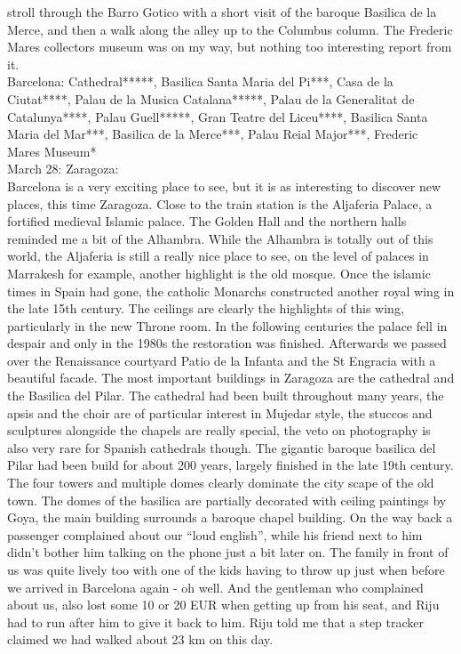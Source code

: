 stroll through the Barro Gotico with a short visit of the baroque Basilica de la Merce, and then a walk along the alley up to the Columbus column. The Frederic Mares collectors museum was on my way, but nothing too interesting report from it. \\

Barcelona: Cathedral*****, Basilica Santa Maria del Pi***, Casa de la Ciutat****, Palau de la Musica Catalana*****, Palau de la Generalitat de Catalunya****, Palau Guell*****, Gran Teatre del Liceu****, Basilica Santa Maria del Mar***, Basilica de la Merce***, Palau Reial Major***,  Frederic Mares Museum*\\

March 28: Zaragoza:\\
Barcelona is a very exciting place to see, but it is as interesting to discover new places, this time Zaragoza. Close to the train station is the Aljaferia Palace, a fortified medieval Islamic palace. The Golden Hall and the northern halls reminded me a bit of the Alhambra. While the Alhambra is totally out of this world, the Aljaferia is still a really nice place to see, on the level of palaces in Marrakesh for example, another highlight is the old mosque. Once the islamic times in Spain had gone, the catholic Monarchs constructed another royal wing in the late 15th century. The ceilings are clearly the highlights of this wing, particularly in the new Throne room. In the following centuries the palace fell in despair and only in the 1980s the restoration was finished.
Afterwards we passed over the Renaissance courtyard Patio de la Infanta and the St Engracia with a beautiful facade. The most important buildings in Zaragoza are the cathedral and the Basilica del Pilar. The cathedral had been built throughout many years, the apsis and the choir are of particular interest in Mujedar style, the stuccos and sculptures alongside the chapels are really special, the veto on photography is also very rare for Spanish cathedrals though. The gigantic baroque basilica del Pilar had been build for about 200 years, largely finished in the late 19th century. The four towers and multiple domes clearly dominate the city scape of the old town. The domes of the basilica are partially decorated with ceiling paintings by Goya, the main building surrounds a baroque chapel building. 
On the way back a passenger complained about our ``loud english'', while his friend next to him didn't bother him talking on the phone just a bit later on. The family in front of us was quite lively too with one of the kids having to throw up just when before we arrived in Barcelona again - oh well. And the gentleman who complained about us, also lost some 10 or 20 EUR when getting up from his seat, and Riju had to run after him to give it back to him. Riju told me that a step tracker claimed we had walked about 23 km on this day.\\

